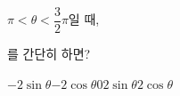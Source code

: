 $\pi<\theta<\dfrac{3}{2}\pi$일 때, \par\smallskip\dispeq{$|\sin\theta|+|\cos\theta|+\sqrt{\sin^2\theta}+\sqrt[3]{\cos^3\theta}$}\par\smallskip\noindent 를 간단히 하면?
\begin{choices32}{$-2\sin\theta$}{$-2\cos\theta$}{$0$}{$2\sin\theta$}{$2\cos\theta$}\end{choices32}
